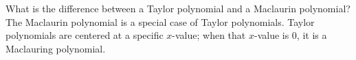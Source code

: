 {What is the difference between a Taylor polynomial and a Maclaurin polynomial?
}
{The Maclaurin polynomial is a special case of Taylor polynomials. Taylor polynomials are centered at a specific $x$-value; when that $x$-value is 0, it is a Maclauring polynomial.
}